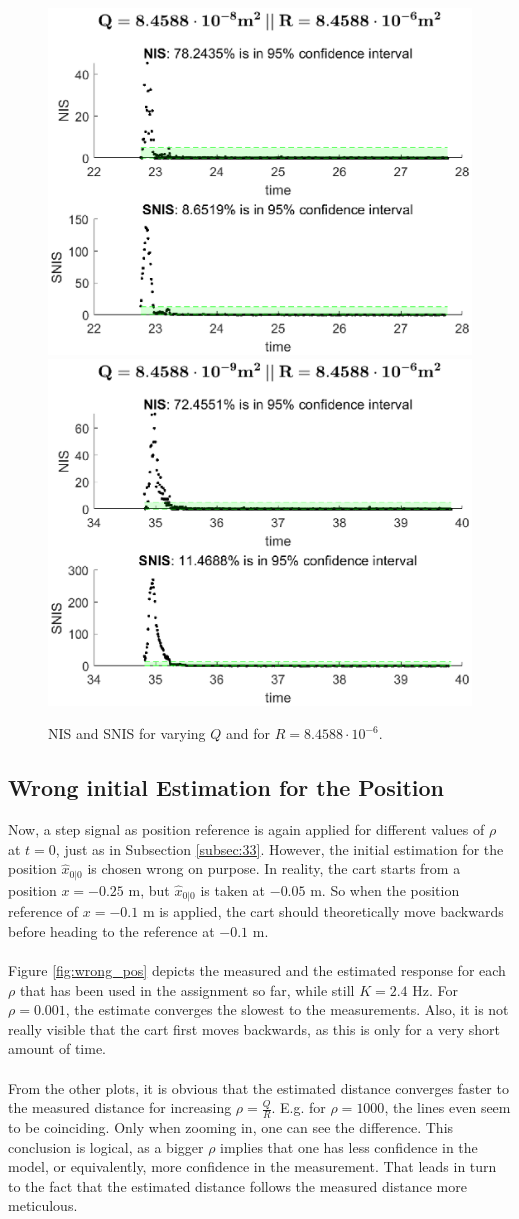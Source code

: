 \documentclass[a4paper,kul]{kulakarticle} %
\begin{document}
\begin{figure}[htp!]
	\includegraphics[width =0.45\linewidth]{SNIS_001}
	\includegraphics[width =0.45\linewidth]{SNIS_0001.eps}
	\caption{NIS and SNIS for varying $Q$ and for $R = 8.4588\cdot10^{-6}$.}
	\label{fig:SNIS}
\end{figure}

\newpage
\subsection{Wrong initial Estimation for the Position}
\label{subsec:35}
Now, a step signal as position reference is again applied for different values of $\rho$ at $t = 0$, just as in Subsection \ref{subsec:33}. However, the initial estimation for the position $\hat{x}_{0|0}$ is chosen wrong on purpose. In reality, the cart starts from a position $x = -0.25$ m, but $\hat{x}_{0|0}$ is taken at $-0.05$ m. So when the position reference of $x = -0.1$ m is applied, the cart should theoretically move backwards before heading to the reference at $-0.1$ m.
\\\\
Figure \ref{fig:wrong_pos} depicts the measured and the estimated response for each $\rho$ that has been used in the assignment so far, while still $K = 2.4$ Hz. For $\rho = 0.001$, the estimate converges the slowest to the measurements. Also, it is not really visible that the cart first moves backwards, as this is only for a very short amount of time.
\\\\
From the other plots, it is obvious that the estimated distance converges faster to the measured distance for increasing $\rho = \frac{Q}{R}$. E.g. for $\rho = 1000$, the lines even seem to be coinciding. Only when zooming in, one can see the difference. This conclusion is logical, as a bigger $\rho$ implies that one has less confidence in the model, or equivalently, more confidence in the measurement. That leads in turn to the fact that the estimated distance follows the measured distance more meticulous. 
\end{document}
